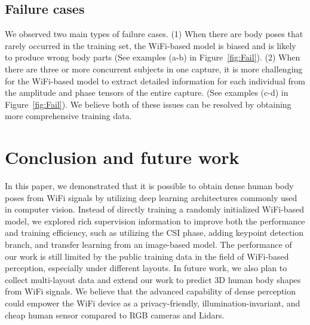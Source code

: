 \documentclass[sigconf, anonymous=false]{acmart}
\begin{document}
\subsection{Failure cases}
We observed two main types of failure cases. (1) When there are body poses that rarely occurred in the training set, the WiFi-based model is biased and is likely to produce wrong body parts (See examples (a-b) in Figure~\ref{fig:Fail}). (2) When there are three or more concurrent subjects in one capture, it is more challenging for the WiFi-based model to extract detailed information for each individual from the amplitude and phase tensors of the entire capture. (See examples (c-d) in Figure~\ref{fig:Fail}). We believe both of these issues can be resolved by obtaining more comprehensive training data.


\section{Conclusion and future work}
In this paper, we demonstrated that it is possible to obtain dense human body poses from WiFi signals by utilizing deep learning architectures commonly used in computer vision. Instead of directly training a randomly initialized WiFi-based model, we explored rich supervision information to improve both the performance and training efficiency, such as utilizing the CSI phase, adding keypoint detection branch, and transfer learning from an image-based model. The performance of our work is still limited by the public training data in the field of WiFi-based perception, especially under different layouts. In future work, we also plan to collect multi-layout data and extend our work to predict 3D human body shapes from WiFi signals. We believe that the advanced capability of dense perception could empower the WiFi device as a privacy-friendly, illumination-invariant, and cheap human sensor compared to RGB cameras and Lidars. 



\end{document}
